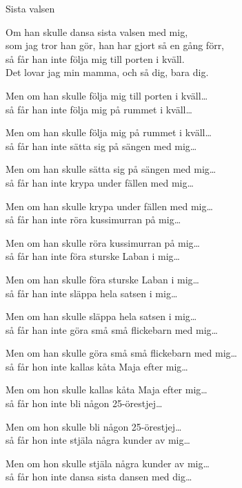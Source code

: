 \begin{song}{Sista valsen}


	\showversenumber
	Om han skulle dansa sista valsen med mig,\\
	som jag tror han gör, han har gjort så en gång förr,\\
	så får han inte följa mig till porten i kväll.\\
	Det lovar jag min mamma, och så dig, bara dig.
	
	\showversenumber
	Men om han skulle följa mig till porten i kväll\ldots{}\\
	så får han inte följa mig på rummet i kväll\ldots{}
	
	\showversenumber
	Men om han skulle följa mig på rummet i kväll\ldots{}\\
	så får han inte sätta sig på sängen med mig\ldots{}
	
	\showversenumber
	Men om han skulle sätta sig på sängen med mig\ldots{}\\
	så får han inte krypa under fällen med mig\ldots{}
	
	\showversenumber
	Men om han skulle krypa under fällen med mig\ldots{}\\
	så får han inte röra kussimurran på mig\ldots{}
	
	\showversenumber
	Men om han skulle röra kussimurran på mig\ldots{}\\
	så får han inte föra sturske Laban i mig\ldots{}
	
	\showversenumber
	Men om han skulle föra sturske Laban i mig\ldots{}\\
	så får han inte släppa hela satsen i mig\ldots{}
	
	\showversenumber
	Men om han skulle släppa hela satsen i mig\ldots{}\\
	så får han inte göra små små flickebarn med mig\ldots{}
	
	\showversenumber
	Men om han skulle göra små små flickebarn med mig\ldots{}\\
	så får hon inte kallas kåta Maja efter mig\ldots{}
	
	\showversenumber
	Men om hon skulle kallas kåta Maja efter mig\ldots{}\\
	så får hon inte bli någon 25-örestjej\ldots{}
	
	\showversenumber
	Men om hon skulle bli någon 25-örestjej\ldots{}\\
	så får hon inte stjäla några kunder av mig\ldots{}
	
	\showversenumber
	Men om hon skulle stjäla några kunder av mig\ldots{}\\
	så får hon inte dansa sista dansen med dig\ldots{}
	
\end{song}
